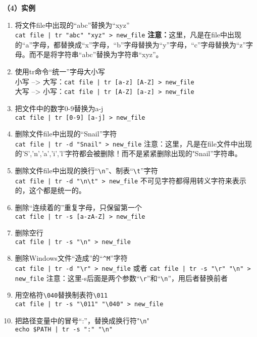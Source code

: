 \textbf{（4）实例}
\begin{enumerate}
\item 将文件file中出现的“abc”替换为“xyz”\\
\verb?cat file | tr "abc" "xyz" > new_file?  \textbf{注意：}这里，凡是在file中出现的“a”字母，都替换成“x”字母，“b”字母替换为“y”字母，“c”字母替换为“z”字母。而不是将字符串“abc”替换为字符串“xyz”。
 
\item 使用tr命令“统一”字母大小写\\
小写 --> 大写：\verb?cat file | tr [a-z] [A-Z] > new_file?\\
大写 --> 小写：\verb?cat file | tr [A-Z] [a-z] > new_file?
 
\item 把文件中的数字0-9替换为a-j\\
\verb?cat file | tr [0-9] [a-j] > new_file?

\item 删除文件file中出现的“Snail”字符\\
\verb?cat file | tr -d "Snail" > new_file?  注意：这里，凡是在file文件中出现的'S','n','a','i','l'字符都会被删除！而不是紧紧删除出现的"Snail”字符串。
 
\item 删除文件file中出现的换行“\verb|\n|”、制表“\verb|\t|”字符\\
\verb?cat file | tr -d "\n\t" > new_file? 不可见字符都得用转义字符来表示的，这个都是统一的。
 
\item 删除“连续着的”重复字母，只保留第一个\\
\verb?cat file | tr -s [a-zA-Z] > new_file?
 
\item 删除空行\\
\verb?cat file | tr -s "\n" > new_file?
 
\item 删除Windows文件“造成”的“\verb|^M|”字符\\
\verb?cat file | tr -d "\r" > new_file?
或者
\verb?cat file | tr -s "\r" "\n" > new_file?
注意：这里-s后面是两个参数“\verb|\r|”和“\verb|\n|”，用后者替换前者
 
\item 用空格符\verb|\040|替换制表符\verb|\011|\\ 
\verb?cat file | tr -s "\011" "\040" > new_file?
 
\item 把路径变量中的冒号“:”，替换成换行符"\verb|\n|"\\
\verb?echo $PATH | tr -s ":" "\n"?
\end{enumerate}




